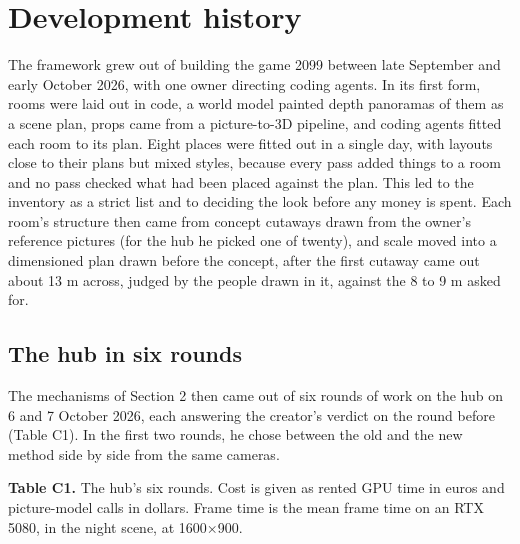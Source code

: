\section{Development history}\label{development-history}

The framework grew out of building the game 2099 between late September and early October 2026, with one owner directing coding agents. In its first form, rooms were laid out in code, a world model painted depth panoramas of them as a scene plan, props came from a picture-to-3D pipeline, and coding agents fitted each room to its plan. Eight places were fitted out in a single day, with layouts close to their plans but mixed styles, because every pass added things to a room and no pass checked what had been placed against the plan. This led to the inventory as a strict list and to deciding the look before any money is spent. Each room's structure then came from concept cutaways drawn from the owner's reference pictures (for the hub he picked one of twenty), and scale moved into a dimensioned plan drawn before the concept, after the first cutaway came out about 13 m across, judged by the people drawn in it, against the 8 to 9 m asked for.

\subsection{The hub in six rounds}\label{the-hub-in-six-rounds}

The mechanisms of Section 2 then came out of six rounds of work on the hub on 6 and 7 October 2026, each answering the creator's verdict on the round before (Table C1). In the first two rounds, he chose between the old and the new method side by side from the same cameras.

\textbf{Table C1.} The hub's six rounds. Cost is given as rented GPU time in euros and picture-model calls in dollars. Frame time is the mean frame time on an RTX 5080, in the night scene, at 1600×900.

